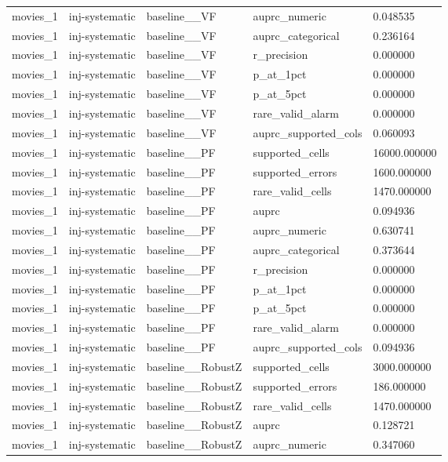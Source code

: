 \begin{tabular}{lllll}
movies\_1 & inj-systematic & baseline\_\_VF & auprc\_numeric & 0.048535 \\
movies\_1 & inj-systematic & baseline\_\_VF & auprc\_categorical & 0.236164 \\
movies\_1 & inj-systematic & baseline\_\_VF & r\_precision & 0.000000 \\
movies\_1 & inj-systematic & baseline\_\_VF & p\_at\_1pct & 0.000000 \\
movies\_1 & inj-systematic & baseline\_\_VF & p\_at\_5pct & 0.000000 \\
movies\_1 & inj-systematic & baseline\_\_VF & rare\_valid\_alarm & 0.000000 \\
movies\_1 & inj-systematic & baseline\_\_VF & auprc\_supported\_cols & 0.060093 \\
movies\_1 & inj-systematic & baseline\_\_PF & supported\_cells & 16000.000000 \\
movies\_1 & inj-systematic & baseline\_\_PF & supported\_errors & 1600.000000 \\
movies\_1 & inj-systematic & baseline\_\_PF & rare\_valid\_cells & 1470.000000 \\
movies\_1 & inj-systematic & baseline\_\_PF & auprc & 0.094936 \\
movies\_1 & inj-systematic & baseline\_\_PF & auprc\_numeric & 0.630741 \\
movies\_1 & inj-systematic & baseline\_\_PF & auprc\_categorical & 0.373644 \\
movies\_1 & inj-systematic & baseline\_\_PF & r\_precision & 0.000000 \\
movies\_1 & inj-systematic & baseline\_\_PF & p\_at\_1pct & 0.000000 \\
movies\_1 & inj-systematic & baseline\_\_PF & p\_at\_5pct & 0.000000 \\
movies\_1 & inj-systematic & baseline\_\_PF & rare\_valid\_alarm & 0.000000 \\
movies\_1 & inj-systematic & baseline\_\_PF & auprc\_supported\_cols & 0.094936 \\
movies\_1 & inj-systematic & baseline\_\_RobustZ & supported\_cells & 3000.000000 \\
movies\_1 & inj-systematic & baseline\_\_RobustZ & supported\_errors & 186.000000 \\
movies\_1 & inj-systematic & baseline\_\_RobustZ & rare\_valid\_cells & 1470.000000 \\
movies\_1 & inj-systematic & baseline\_\_RobustZ & auprc & 0.128721 \\
movies\_1 & inj-systematic & baseline\_\_RobustZ & auprc\_numeric & 0.347060 \\

\end{tabular}
